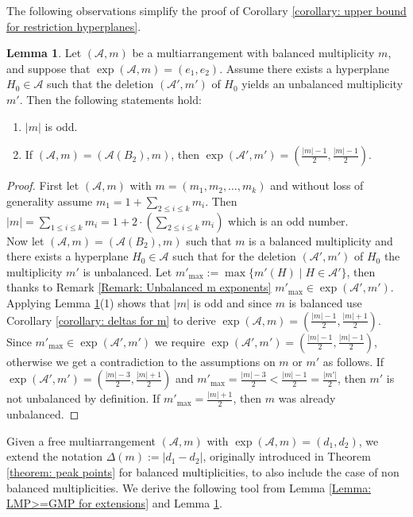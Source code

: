 \documentclass[12pt]{amsart}
\theoremstyle{definition}
\newtheorem{lemma}[theorem]{Lemma}
\theoremstyle{remark}
\newcommand\CA{{\mathscr A}}
\begin{document}
The following observations simplify the proof of Corollary \ref{corollary: upper bound for restriction hyperplanes}.

\begin{lemma}\label{Lemma: deletion unbalanced then no peak point}
    Let $(\CA,m)$ be a multiarrangement with balanced multiplicity $m$, and suppose that $\exp(\CA,m)=(e_1,e_2)$. Assume there exists a hyperplane $H_0\in\CA$ such that the deletion $(\CA',m')$ of $H_0$ yields an unbalanced multiplicity $m'$. Then the following statements hold:
    \begin{enumerate}
        \item $\vert m\vert$ is odd.
        \item If $(\CA,m)=(\CA(B_2),m)$, then $\exp(\CA',m')=(\frac{\vert m\vert-1}{2},\frac{\vert m\vert-1}{2})$.
    \end{enumerate}
\end{lemma}
\begin{proof}
    First let $(\CA,m)$ with $m=(m_1,m_2,\dots,m_k)$ and without loss of generality assume $m_1=1+\sum_{2\leq i\leq k}m_i$. Then $\vert m\vert=\sum_{1\leq i\leq k}m_i=1+2\cdot(\sum_{2\leq i\leq k}m_i)$ which is an odd number.\\
    Now let $(\CA,m)=(\CA(B_2),m)$ such that $m$ is a balanced multiplicity and there exists a hyperplane $H_0\in\CA$ such that for the deletion $(\CA',m')$ of $H_0$ the multiplicity $m'$ is unbalanced. Let $m'_{\max}:=\max\{m'(H)\mid H\in \CA'\}$, then thanks to Remark \ref{Remark: Unbalanced m exponents} $m'_{\max}\in\exp(\CA',m')$.\\
    Applying Lemma \ref{Lemma: deletion unbalanced then no peak point}(1) shows that $\vert m\vert$ is odd and since $m$ is balanced use Corollary \ref{corollary: deltas for m} to derive $\exp(\CA,m)=(\frac{\vert m\vert-1}{2},\frac{\vert m\vert+1}{2})$. Since $m'_{\max}\in\exp(\CA',m')$ we require $\exp(\CA',m')=(\frac{\vert m\vert-1}{2},\frac{\vert m\vert-1}{2})$, otherwise we get a contradiction to the assumptions on $m$ or $m'$ as follows. If $\exp(\CA',m')=(\frac{\vert m\vert-3}{2},\frac{\vert m\vert+1}{2})$ and $m'_{\max}=\frac{\vert m\vert-3}{2}<\frac{\vert m\vert-1}{2}=\frac{\vert m'\vert}{2}$, then $m'$ is not unbalanced by definition. If $m'_{\max}=\frac{\vert m\vert+1}{2}$, then $m$ was already unbalanced.
\end{proof}

Given a free multiarrangement $(\CA,m)$ with $\exp(\CA,m)=(d_1,d_2)$, we extend the notation $\Delta(m):=\vert d_1-d_2\vert$, originally introduced in Theorem \ref{theorem: peak points} for balanced multiplicities, to also include the case of non balanced multiplicities. We derive the following tool from Lemma \ref{Lemma: LMP>=GMP for extensions} and Lemma \ref{Lemma: deletion unbalanced then no peak point}. 
\end{document}
